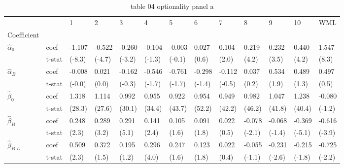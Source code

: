 \begin{table}[htbp]
  \centering
  \caption{table 04 optionality panel a}
  \label{tab:table_04_optionality_panel_a}
  \begin{tabular}{lllllllllllll}
\toprule
 &  & 1 & 2 & 3 & 4 & 5 & 6 & 7 & 8 & 9 & 10 & WML \\
Coefficient &  &  &  &  &  &  &  &  &  &  &  &  \\
\midrule
\multirow[t]{2}{*}{$\hat{\alpha}_0$} & coef & -1.107 & -0.522 & -0.260 & -0.104 & -0.003 & 0.027 & 0.104 & 0.219 & 0.232 & 0.440 & 1.547 \\
 & t-stat & (-8.3) & (-4.7) & (-3.2) & (-1.3) & (-0.1) & (0.6) & (2.0) & (4.2) & (3.5) & (4.2) & (8.3) \\
\cline{1-13}
\multirow[t]{2}{*}{$\hat{\alpha}_B$} & coef & -0.008 & 0.021 & -0.162 & -0.546 & -0.761 & -0.298 & -0.112 & 0.037 & 0.534 & 0.489 & 0.497 \\
 & t-stat & (-0.0) & (0.0) & (-0.3) & (-1.7) & (-1.7) & (-1.4) & (-0.5) & (0.2) & (1.9) & (1.3) & (0.5) \\
\cline{1-13}
\multirow[t]{2}{*}{$\hat{\beta}_0$} & coef & 1.318 & 1.114 & 0.992 & 0.955 & 0.922 & 0.954 & 0.949 & 0.982 & 1.047 & 1.238 & -0.080 \\
 & t-stat & (28.3) & (27.6) & (30.1) & (34.4) & (43.7) & (52.2) & (42.2) & (46.2) & (41.8) & (40.4) & (-1.2) \\
\cline{1-13}
\multirow[t]{2}{*}{$\hat{\beta}_B$} & coef & 0.248 & 0.289 & 0.291 & 0.141 & 0.105 & 0.091 & 0.022 & -0.078 & -0.068 & -0.369 & -0.616 \\
 & t-stat & (2.3) & (3.2) & (5.1) & (2.4) & (1.6) & (1.8) & (0.5) & (-2.1) & (-1.4) & (-5.1) & (-3.9) \\
\cline{1-13}
\multirow[t]{2}{*}{$\hat{\beta}_{B,U}$} & coef & 0.509 & 0.372 & 0.195 & 0.296 & 0.247 & 0.123 & 0.022 & -0.055 & -0.231 & -0.215 & -0.725 \\
 & t-stat & (2.3) & (1.5) & (1.2) & (4.0) & (1.6) & (1.8) & (0.4) & (-1.1) & (-2.6) & (-1.8) & (-2.2) \\
\cline{1-13}
\bottomrule
\end{tabular}

\end{table}

